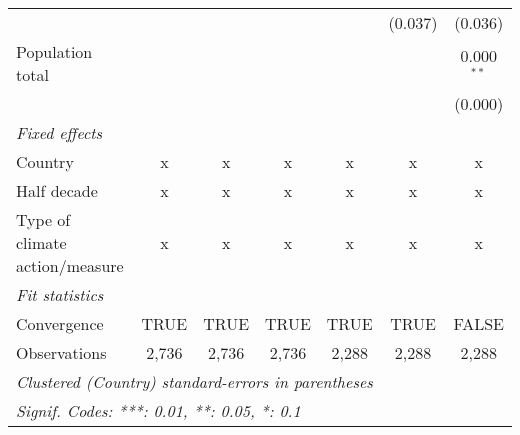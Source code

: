 \begin{tabular}{lcccccc}
                                                  &               &               &               &               & (0.037)       & (0.036)\\   
   Population total                               &               &               &               &               &               & 0.000$^{**}$\\   
                                                  &               &               &               &               &               & (0.000)\\   
   \emph{Fixed effects}\\
   Country                                        & x             & x             & x             & x             & x             & x\\  
   Half decade                                    & x             & x             & x             & x             & x             & x\\  
   Type of climate action/measure                 & x             & x             & x             & x             & x             & x\\  
   \midrule \emph{Fit statistics}\\
   Convergence                                    &TRUE           & TRUE          & TRUE          & TRUE          & TRUE          & FALSE\\  
   Observations                                   & 2,736         & 2,736         & 2,736         & 2,288         & 2,288         & 2,288\\  
   \midrule
   \multicolumn{7}{l}{\emph{Clustered (Country) standard-errors in parentheses}}\\
   \multicolumn{7}{l}{\emph{Signif. Codes: ***: 0.01, **: 0.05, *: 0.1}}\\
\end{tabular}
\par\endgroup


